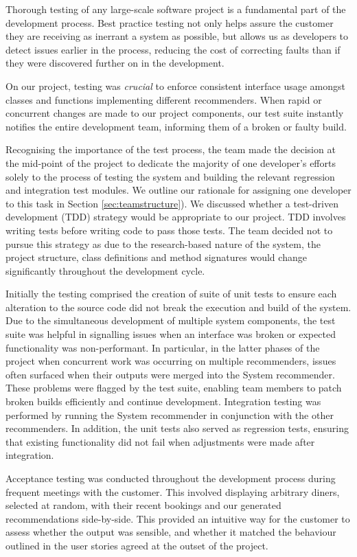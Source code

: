 \documentclass{l3proj}
\begin{document}
Thorough testing of any large-scale software project is a fundamental part of the development process. Best practice testing not only helps assure the customer they are receiving as inerrant a system as possible, but allows us as developers to detect issues earlier in the process, reducing the cost of correcting faults than if they were discovered further on in the development. 

On our project, testing was \textit{crucial} to enforce consistent interface usage amongst classes and functions implementing different recommenders. When rapid or concurrent changes are made to our project components, our test suite instantly notifies the entire development team, informing them of a broken or faulty build.

Recognising the importance of the test process, the team made the decision at the mid-point of the project to dedicate the majority of one developer's efforts solely to the process of testing the system and building the relevant regression and integration test modules. We outline our rationale for assigning one developer to this task in Section \ref{sec:teamstructure}). We discussed whether a test-driven development (TDD) strategy would be appropriate to our project. TDD involves writing tests before writing code to pass those tests. The team decided not to pursue this strategy as due to the research-based nature of the system, the project structure, class definitions and method signatures would change significantly throughout the development cycle. 

Initially the testing comprised the creation of suite of unit tests to ensure each alteration to the source code did not break the execution and build of the system. Due to the simultaneous development of multiple system components, the test suite was helpful in signalling issues when an interface was broken or expected functionality was non-performant. In particular, in the latter phases of the project when concurrent work was occurring on multiple recommenders, issues often surfaced when their outputs were merged into the System recommender. These problems were flagged by the test suite, enabling team members to patch broken builds efficiently and continue development. Integration testing was performed by running the System recommender in conjunction with the other recommenders. In addition, the unit tests also served as regression tests, ensuring that existing functionality did not fail when adjustments were made after integration.

Acceptance testing was conducted throughout the development process during frequent meetings with the customer. This involved displaying arbitrary diners, selected at random, with their recent bookings and our generated recommendations side-by-side. This provided an intuitive way for the customer to assess whether the output was sensible, and whether it matched the behaviour outlined in the user stories agreed at the outset of the project.
\end{document}
